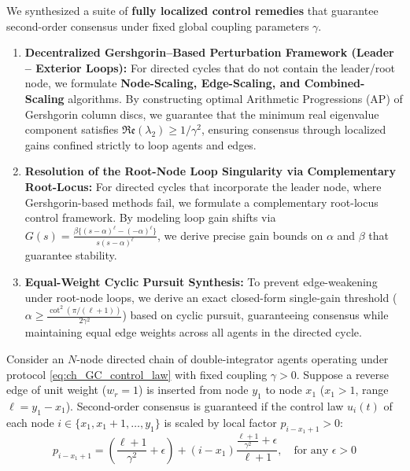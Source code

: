 \documentclass[openright,twoside]{iitbthesis}
\begin{document}
We synthesized a suite of \textbf{fully localized control remedies} that guarantee second-order consensus under fixed global coupling parameters $\gamma$. 
\begin{enumerate}
    \item \textbf{Decentralized Gershgorin--Based Perturbation Framework (Leader -- Exterior Loops):} For directed cycles that do not contain the leader/root node, we formulate \textbf{Node-Scaling, Edge-Scaling, and Combined-Scaling} algorithms. By constructing optimal Arithmetic Progressions (AP) of Gershgorin column discs, we guarantee that the minimum real eigenvalue component satisfies $\mathfrak{Re}(\lambda_2) \ge 1/\gamma^2$, ensuring consensus through localized gains confined strictly to loop agents and edges.
    \item \textbf{Resolution of the Root-Node Loop Singularity via Complementary Root-Locus:} For directed cycles that incorporate the leader node, where Gershgorin-based methods fail, we formulate a complementary root-locus control framework. By modeling loop gain shifts via $G(s) = \frac{\beta\{(s-\alpha)^\ell - (-\alpha)^\ell\}}{s(s-\alpha)^\ell}$, we derive precise gain bounds on $\alpha$ and $\beta$ that guarantee stability.
    \item \textbf{Equal-Weight Cyclic Pursuit Synthesis:} To prevent edge-weakening under root-node loops, we derive an exact closed-form single-gain threshold ($\alpha \ge \frac{\cot^2(\pi/(\ell+1))}{2\gamma^2}$) based on cyclic pursuit, guaranteeing consensus while maintaining equal edge weights across all agents in the directed cycle.
\end{enumerate}
\begin{theo}\label{theo1}
Consider an $N$-node directed chain of double-integrator agents operating under protocol \eqref{eq:ch_GC_control_law} with fixed coupling $\gamma > 0$. Suppose a reverse edge of unit weight ($w_r = 1$) is inserted from node $y_1$ to node $x_1$ ($x_1 > 1$, range $\ell = y_1 - x_1$). Second-order consensus is guaranteed if the control law $u_i(t)$ of each node $i \in \{x_1, x_1+1, \dots, y_1\}$ is scaled by local factor $p_{i-x_1+1} > 0$:
\begin{equation}\label{eq:ch_GC_NodeScalar_formula}
	p_{i-x_1+1} = \left( \frac{\ell+1}{\gamma^2} + \epsilon \right) + (i - x_1) \frac{\frac{\ell+1}{\gamma^2} + \epsilon}{\ell + 1}, \quad \text{for any } \epsilon > 0
\end{equation}
\end{theo}
\end{document}
